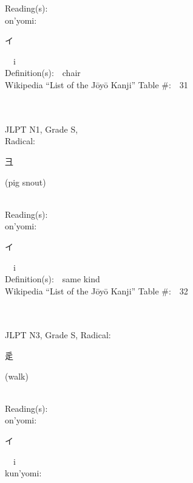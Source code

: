 \begin{multicols}{2}
Reading(s):\ \ \\
{\hspace*{1em}}on'yomi:\ \ \\
{\hspace*{2em}}{\begin{CJK}{UTF8}{min} イ \end{CJK}}\ \ i\ \ \\
Definition(s):\ \ chair \\
Wikipedia ``List of the J\=oy\=o Kanji'' Table \#:\ \ 31 \\
\ \ \\
{\fontsize{34pt}{40pt}  }\ \ \\
{JLPT N1, Grade S, \\Radical:\ \ {\begin{CJK}{UTF8}{min} 彐 \end{CJK}} (pig snout) } \\
Reading(s):\ \ \\
{\hspace*{1em}}on'yomi:\ \ \\
{\hspace*{2em}}{\begin{CJK}{UTF8}{min} イ \end{CJK}}\ \ i\ \ \\
Definition(s):\ \ same kind \\
Wikipedia ``List of the J\=oy\=o Kanji'' Table \#:\ \ 32 \\
\ \ \\
{\fontsize{34pt}{40pt}  }\ \ \\  %
{JLPT N3, Grade S, Radical:\ \ {\begin{CJK}{UTF8}{min} 辵 \end{CJK}} (walk) } \\
Reading(s):\ \ \\
{\hspace*{1em}}on'yomi:\ \ \\
{\hspace*{2em}}{\begin{CJK}{UTF8}{min} イ \end{CJK}}\ \ i\ \ \\
{\hspace*{1em}}kun'yomi:\ \ \\

\end{multicols}
